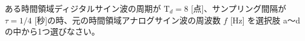 ある時間領域ディジタルサイン波の周期が $\textrm{T}_d = 8$ [点]、サンプリング間隔が $\tau = 1/4$ [秒]の時、元の時間領域アナログサイン波の周波数 $f$ [Hz] を選択肢 a〜d の中から1つ選びなさい。
